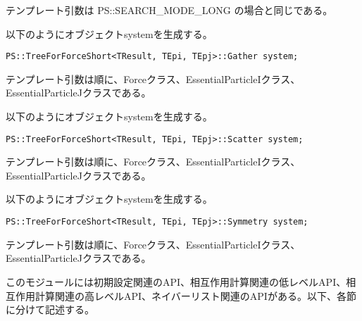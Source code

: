 テンプレート引数は PS::SEARCH\_MODE\_LONG の場合と同じである。


以下のようにオブジェクトsystemを生成する。
\begin{screen}
\begin{verbatim}
PS::TreeForForceShort<TResult, TEpi, TEpj>::Gather system;
\end{verbatim}
\end{screen}
テンプレート引数は順に、Forceクラス、EssentialParticleIクラス、
EssentialParticleJクラスである。


以下のようにオブジェクトsystemを生成する。
\begin{screen}
\begin{verbatim}
PS::TreeForForceShort<TResult, TEpi, TEpj>::Scatter system;
\end{verbatim}
\end{screen}
テンプレート引数は順に、Forceクラス、EssentialParticleIクラス、
EssentialParticleJクラスである。


以下のようにオブジェクトsystemを生成する。
\begin{screen}
\begin{verbatim}
PS::TreeForForceShort<TResult, TEpi, TEpj>::Symmetry system;
\end{verbatim}
\end{screen}
テンプレート引数は順に、Forceクラス、EssentialParticleIクラス、
EssentialParticleJクラスである。


このモジュールには初期設定関連のAPI、相互作用計算関連の低レベルAPI、相
互作用計算関連の高レベルAPI、ネイバーリスト関連のAPIがある。以下、各節
に分けて記述する。

